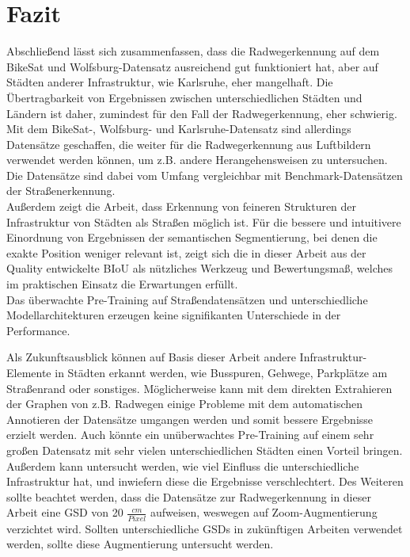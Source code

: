 \chapter{Fazit}

Abschließend lässt sich zusammenfassen, dass die Radwegerkennung auf dem BikeSat und Wolfsburg-Datensatz 
ausreichend gut funktioniert hat, aber auf Städten anderer Infrastruktur, wie Karlsruhe, eher mangelhaft.
Die Übertragbarkeit von Ergebnissen zwischen unterschiedlichen Städten und Ländern ist daher, zumindest 
für den Fall der Radwegerkennung, eher schwierig. Mit dem BikeSat-, Wolfsburg- und Karlsruhe-Datensatz 
sind allerdings Datensätze geschaffen, die weiter für die Radwegerkennung aus Luftbildern verwendet 
werden können, um z.B. andere Herangehensweisen zu untersuchen. Die Datensätze sind dabei vom Umfang 
vergleichbar mit Benchmark-Datensätzen der Straßenerkennung. \\
Außerdem zeigt die Arbeit, dass Erkennung von feineren Strukturen der Infrastruktur von Städten als Straßen 
möglich ist. Für die bessere und intuitivere Einordnung von Ergebnissen der semantischen Segmentierung, 
bei denen die exakte Position weniger relevant ist, zeigt sich die in dieser Arbeit aus der Quality entwickelte \ac{BIoU} 
als nützliches Werkzeug und Bewertungsmaß, welches im praktischen Einsatz die Erwartungen erfüllt. \\
Das überwachte Pre-Training auf Straßendatensätzen und unterschiedliche Modellarchitekturen 
erzeugen keine signifikanten Unterschiede in der Performance. 

Als Zukunftsausblick können auf Basis dieser Arbeit andere Infrastruktur-Elemente in Städten erkannt werden, 
wie Busspuren, Gehwege, Parkplätze am Straßenrand oder sonstiges. 
Möglicherweise kann mit dem direkten Extrahieren der Graphen von z.B. Radwegen einige Probleme mit dem automatischen 
Annotieren der Datensätze umgangen werden und somit bessere Ergebnisse erzielt werden. 
Auch könnte ein unüberwachtes Pre-Training auf einem sehr großen Datensatz mit sehr vielen unterschiedlichen 
Städten einen Vorteil bringen. Außerdem kann untersucht werden, wie viel Einfluss die unterschiedliche 
Infrastruktur hat, und inwiefern diese die Ergebnisse verschlechtert. 
Des Weiteren sollte beachtet werden, dass die Datensätze zur Radwegerkennung in dieser Arbeit 
eine \ac{GSD} von 20 $\frac{cm}{Pixel}$ aufweisen, weswegen auf Zoom-Augmentierung verzichtet wird. 
Sollten unterschiedliche \acp{GSD} in zukünftigen Arbeiten verwendet werden, sollte diese Augmentierung 
untersucht werden. 
